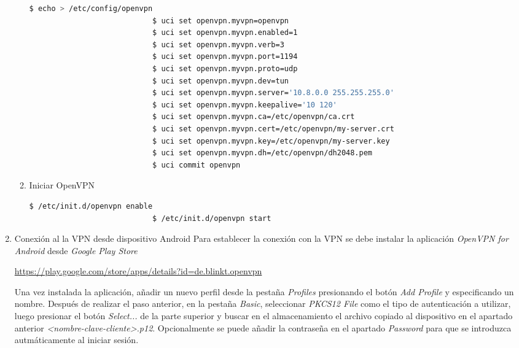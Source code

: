 \documentclass[12pt]{article}
\begin{document}
\begin{enumerate}
\begin{enumerate}
                        \begin{lstlisting}[language=bash]
                            $ echo > /etc/config/openvpn
                            $ uci set openvpn.myvpn=openvpn
                            $ uci set openvpn.myvpn.enabled=1
                            $ uci set openvpn.myvpn.verb=3
                            $ uci set openvpn.myvpn.port=1194
                            $ uci set openvpn.myvpn.proto=udp
                            $ uci set openvpn.myvpn.dev=tun
                            $ uci set openvpn.myvpn.server='10.8.0.0 255.255.255.0'
                            $ uci set openvpn.myvpn.keepalive='10 120'
                            $ uci set openvpn.myvpn.ca=/etc/openvpn/ca.crt
                            $ uci set openvpn.myvpn.cert=/etc/openvpn/my-server.crt
                            $ uci set openvpn.myvpn.key=/etc/openvpn/my-server.key
                            $ uci set openvpn.myvpn.dh=/etc/openvpn/dh2048.pem
                            $ uci commit openvpn
                        \end{lstlisting}

                        \item Iniciar OpenVPN
                        \begin{lstlisting}[language=bash]
                            $ /etc/init.d/openvpn enable
                            $ /etc/init.d/openvpn start
                        \end{lstlisting}
                    \end{enumerate}

                \item Conexión al la VPN desde dispositivo Android
                Para establecer la conexión con la VPN se debe instalar la aplicación \textit{OpenVPN for Android} desde \textit{Google Play Store}
                
                \url{https://play.google.com/store/apps/details?id=de.blinkt.openvpn}

                Una vez instalada la aplicación, añadir un nuevo perfil desde la pestaña \textit{Profiles} presionando el botón \textit{Add Profile} y especificando un nombre. Después de realizar el paso anterior, en la pestaña \textit{Basic}, seleccionar \textit{PKCS12 File} como el tipo de autenticación a utilizar, luego presionar el botón \textit{Select...} de la parte superior y buscar en el almacenamiento el archivo copiado al dispositivo en el apartado anterior \textit{<nombre-clave-cliente>.p12}. Opcionalmente se puede añadir la contraseña en el apartado \textit{Password} para que se introduzca autmáticamente al iniciar sesión.


\end{enumerate}
\end{document}
